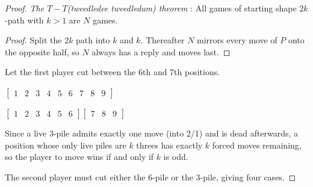 \documentclass[11pt]{article}
\begin{document}
\begin{enumerate}[leftmargin=*]
\begin{enumerate}
\begin{proof}
        \textit{The $T-T$(tweedledee tweedledum) theorem} : All games of starting
        shape $2k$-path with $k > 1$ are $N$ games.
        \begin{proof}
            Split the $2k$ path into $k$ and $k$. Thereafter $N$ mirrors every move of $P$ onto the opposite half, so $N$ always has a reply and moves last.
        \end{proof}
        Let the first player cut between the 6th and 7th positions.
        \begin{center}
        $\begin{bmatrix} 1&2&3&4&5&6&7&8&9 \end{bmatrix}$
        \end{center}
        \begin{center}
        $\begin{bmatrix} 1&2&3&4&5&6 \end{bmatrix}
         \begin{bmatrix} 7&8&9 \end{bmatrix}$
        \end{center}
        Since a live 3-pile admits exactly one move (into 2/1) and is dead afterwards, a position whose only live piles are $k$ threes has exactly $k$ forced moves remaining, so the player to move wins if and only if $k$ is odd.
        
        The second player must cut either the 6-pile or the 3-pile, giving four cases.
        

\end{proof}
\end{enumerate}
\end{enumerate}
\end{document}
